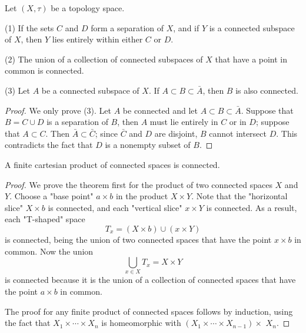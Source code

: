 \documentclass[12pt, a4paper, oneside]{book}
\begin{document}
\begin{theorem}
    Let $\left(X,\tau\right)$ be a topology space.

    (1) If the sets $C$ and $D$ form a separation of $X$, and if $Y$ is a connected subspace of $X$, then $Y$ lies entirely within either $C$ or $D$.

    (2) The union of a collection of connected subspaces of $X$ that have a point in common is connected.

    (3) Let $A$ be a connected subspace of $X$. If $A \subset B \subset \bar{A}$, then $B$ is also connected.
    \begin{proof}
        We only prove (3).
        Let $A$ be connected and let $A \subset B \subset \bar{A}$. Suppose that $B=C \cup D$ is a separation of $B$, then $A$ must lie entirely in $C$ or in $D$; suppose that $A \subset C$. Then $\bar{A} \subset \bar{C}$; since $\bar{C}$ and $D$ are disjoint, $B$ cannot intersect $D$. This contradicts the fact that $D$ is a nonempty subset of $B$.
    \end{proof}
\end{theorem}

\begin{theorem}
    A finite cartesian product of connected spaces is connected.
    \begin{proof}
        We prove the theorem first for the product of two connected spaces $X$ and $Y$.
        Choose a "base point" $a \times b$ in the product $X \times Y$. Note that the "horizontal slice" $X \times b$ is connected, and each "vertical slice" $x \times Y$ is connected.
        As a result, each "T-shaped" space
        \begin{equation*}
            T_x=(X \times b) \cup(x \times Y)
        \end{equation*}
        is connected, being the union of two connected spaces that have the point $x \times b$ in common.
        Now the union
        \begin{equation*}
            \bigcup_{x\in X} T_x =X\times Y
        \end{equation*}
        is connected because it is the union of a collection of connected spaces that have the point $a \times b$ in common.

        The proof for any finite product of connected spaces follows by induction, using the fact that $X_1 \times \cdots \times X_n$ is homeomorphic with $\left(X_1 \times \cdots \times X_{n-1}\right) \times$ $X_n$.
    \end{proof}
\end{theorem}
\end{document}
